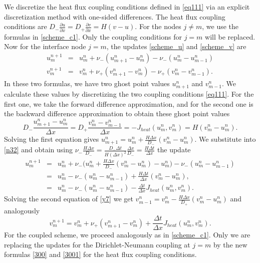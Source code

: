 We discretize the heat flux coupling conditions defined in \eqref{eq111} via an explicit discretization method with one-sided 
differences. The heat flux coupling conditions are 
$D_{-}\frac{\partial u}{\partial x}= D_{+}\frac{\partial v}{\partial x}=H(v-u).$
For the nodes $j\ne m$, we use the formulas in \eqref{scheme_c1}. Only the coupling conditions for $j=m$ will be replaced.
Now for the interface node $j=m$, the updates \eqref{scheme_u} and \eqref{scheme_v} are
%
\begin{eqnarray}
 \label{n32}
 u^{n+1}_{m}&=&u^{n}_{m}+\nu_-(u^{n}_{m+1}-u^{n}_{m})-\nu_- (u^{n}_{m}-u^n_{m-1})\nonumber\\
 v^{n+1}_{m}&=&v^{n}_{m}+\nu_+(v^{n}_{m+1}-v^{n}_{m})-\nu_+(v^{n}_{m}-v^n_{m-1}).
\end{eqnarray}
%
In these two formulas, we have two ghost point values $u^n_{m+1}$ and $v^n_{m-1}$. We calculate these values by discretizing
the two coupling conditions \eqref{eq111}.
For the first one, we take the forward difference approximation, and for
the second one is the backward difference approximation to obtain these ghost point values
% 
\begin{equation}
D_{-}\frac{u_{m+1}^n-u_{m}^n}{\Delta x}=D_{+}\frac{v_{m}^n-v_{m-1}^n}{\Delta x}= -J_{heat}(u_m^n,v_m^n) = H(v_{m}^n-u_{m}^n).
\label{y7}
\end{equation}
%
Solving the first equation gives $u_{m+1}^{n}=u_{m}^n+\frac{H\Delta x}{D_{-}}(v_{m}^n-u_{m}^n)$.
We substitute into \eqref{n32} and obtain using $\nu_-\frac{H\Delta x}{D_{-}} 
=\frac{ D_{-}\Delta t}{H(\Delta x)^2}\frac{\Delta x}{D_{-}} =\frac{H \Delta t}{\Delta x}$ the update
%
\begin{eqnarray} 
u_{m}^{n+1}&=&u^n_m+\nu_- \Big(u_{m}^n+\frac{H\Delta x}{D_{-}}(v_{m}^n-u_{m}^n)-u^n_m\Big)-\nu_-( u_{m}^{n}-u^n_{m-1})\nonumber\\
&=&u^n_m-\nu_-(u^n_m-u^n_{m-1})+\frac{H \Delta t}{\Delta x}(v^n_m-u^n_m),\nonumber\\
&=&u^n_m-\nu_-(u^n_m-u^n_{m-1})-\frac{\Delta t}{\Delta x}J_{heat}(u^n_m,v_m^n).
\label{300}
\end{eqnarray}
%
Solving the second equation of \eqref{y7} we get $v_{m-1}^{n}=v_{m}^n-\frac{H \Delta x}{D_{+}} (v_{m}^n-u_{m}^n)$ and
analogously
%
\begin{equation}
v_{m}^{n+1}=v^n_m+\nu_+(v^n_{m+1}-v^n_m)+\frac{\Delta t}{\Delta x}J_{heat}(u^n_m,v_m^n).
\label{3001}
\end{equation}
%
For the coupled scheme, we proceed analogously as in \eqref{scheme_c1}. Only we are replacing the 
updates for the Dirichlet-Neumann coupling at $j=m$
by the new formulas  \eqref{300} and \eqref{3001} for the heat flux coupling conditions.

